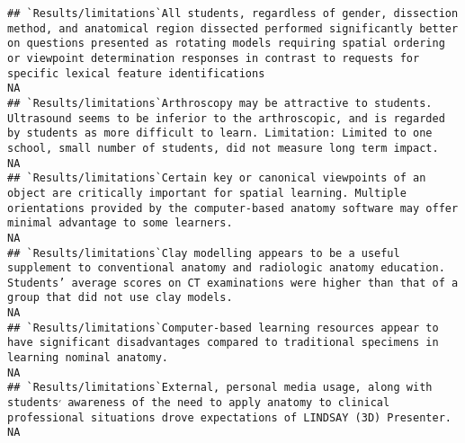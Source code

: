 \documentclass[]{article}
\begin{document}
\begin{verbatim}
## `Results/limitations`All students, regardless of gender, dissection method, and anatomical region dissected performed significantly better on questions presented as rotating models requiring spatial ordering or viewpoint determination responses in contrast to requests for specific lexical feature identifications                                                                                                                                                             NA
## `Results/limitations`Arthroscopy may be attractive to students. Ultrasound seems to be inferior to the arthroscopic, and is regarded by students as more difficult to learn. Limitation: Limited to one school, small number of students, did not measure long term impact.                                                                                                                                                                                                           NA
## `Results/limitations`Certain key or canonical viewpoints of an object are critically important for spatial learning. Multiple orientations provided by the computer-based anatomy software may offer minimal advantage to some learners.                                                                                                                                                                                                                                              NA
## `Results/limitations`Clay modelling appears to be a useful supplement to conventional anatomy and radiologic anatomy education. Students’ average scores on CT examinations were higher than that of a group that did not use clay models.                                                                                                                                                                                                                                            NA
## `Results/limitations`Computer-based learning resources appear to have significant disadvantages compared to traditional specimens in learning nominal anatomy.                                                                                                                                                                                                                                                                                                                        NA
## `Results/limitations`External, personal media usage, along with students׳ awareness of the need to apply anatomy to clinical professional situations drove expectations of LINDSAY (3D) Presenter.                                                                                                                                                                                                                                                                                    NA

\end{verbatim}
\end{document}
